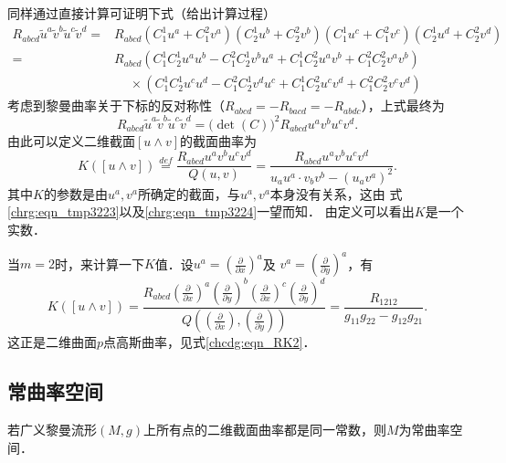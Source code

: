 同样通过直接计算可证明下式（给出计算过程）
\begin{align*}
    R_{abcd}\tilde{u}^a\tilde{v}^b\tilde{u}^c\tilde{v}^d = & R_{abcd}
    (C_1^1 u^a +C_1^2 v^a) (C_2^1 u^b +C_2^2 v^b)(C_1^1 u^c +C_1^2 v^c) (C_2^1 u^d +C_2^2 v^d) \\
    =&R_{abcd}(C_1^1 C_2^1 u^a u^b -C_1^2 C_2^1 v^b u^a+ C_1^1 C_2^2 u^a v^b +C_1^2 C_2^2 v^a v^b) \\
    &\phantom{R_{a}}\times (C_1^1 C_2^1 u^c u^d -C_1^2 C_2^1 v^d u^c+ C_1^1 C_2^2 u^c v^d +C_1^2 C_2^2 v^c v^d)
\end{align*}
考虑到黎曼曲率关于下标的反对称性（$R_{abcd}=-R_{bacd}=-R_{abdc}$），上式最终为
\begin{equation}\label{chrg:eqn_tmp3224}
    R_{abcd}\tilde{u}^a\tilde{v}^b\tilde{u}^c\tilde{v}^d = \bigl(\det(C)\bigr)^2 R_{abcd} u^a v^b u^c v^d .
\end{equation}
由此可以定义二维截面$[u\wedge v]$的{\heiti 截面曲率}为
\begin{equation}\label{chrg:eqn_sectional-curvature}
    K([u\wedge v]) \overset{def}{=}  \frac{R_{abcd} u^a v^b u^c v^d}{Q(u,v)} 
    = \frac{R_{abcd} u^a v^b u^c v^d}{{u}_a{u}^a \cdot {v}_b{v}^b - ({u}_a{v}^a)^2 } .
\end{equation}
其中$K$的参数是由$u^a,v^a$所确定的截面，与$u^a,v^a$本身没有关系，这由
式\eqref{chrg:eqn_tmp3223}以及\eqref{chrg:eqn_tmp3224}一望而知．
由定义可以看出$K$是一个实数．

\begin{example}\label{chrg:exam_sc-gauss}
    当$m=2$时，来计算一下$K$值．设$u^a=(\frac{\partial}{\partial x})^a$及
    $v^a=(\frac{\partial}{\partial y})^a$，有
    \begin{equation}
        K([u\wedge v]) = \frac{R_{abcd} (\frac{\partial}{\partial x})^a (\frac{\partial}{\partial y})^b
            (\frac{\partial}{\partial x})^c (\frac{\partial}{\partial y})^d}
          {Q((\frac{\partial}{\partial x}),(\frac{\partial}{\partial y}))}
        =\frac{R_{1212}}{g_{11}g_{22}-g_{12}g_{21}} .
    \end{equation}
    这正是二维曲面$p$点高斯曲率，见式\eqref{chcdg:eqn_RK2}．
\end{example}


\subsection{常曲率空间}\label{chrg:sec_const-curvature}
\begin{definition}
        若广义黎曼流形$(M,g)$上所有点的二维截面曲率都是同一常数，则$M$为{\heiti 常曲率空间}．
\end{definition}

